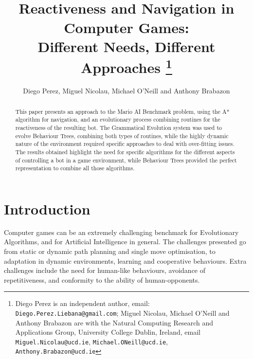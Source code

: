 \documentclass[conference]{IEEEtran}
\begin{document}
\title{\ \\ \LARGE\bf Reactiveness and Navigation in Computer Games:\\ Different Needs, Different Approaches \thanks{Diego Perez is an independent author, email: {\tt Diego.Perez.Liebana@gmail.com}; Miguel Nicolau, Michael O'Neill and Anthony Brabazon are with the Natural Computing Research and Applications Group, University College Dublin, Ireland, email {\tt Miguel.Nicolau@ucd.ie}, {\tt Michael.ONeill@ucd.ie}, {\tt Anthony.Brabazon@ucd.ie}}}


\author{Diego Perez, Miguel Nicolau, Michael O'Neill and Anthony Brabazon}


\maketitle

\begin{abstract}
This paper presents an approach to the Mario AI Benchmark problem, using
the A* algorithm for navigation, and an evolutionary process combining
routines for the reactiveness of the resulting bot. The Grammatical
Evolution system was used to evolve Behaviour Trees, combining both types of
routines, while the highly dynamic nature of the environment required specific
approaches to deal with over-fitting issues. The results obtained highlight
the need for specific algorithms for the different aspects of controlling a bot
in a game environment, while Behaviour Trees provided the perfect
representation to combine all those algorithms.
\end{abstract}

\section{Introduction}

Computer games can be an extremely challenging benchmark for Evolutionary
Algorithms, and for Artificial Intelligence in general. The challenges
presented go from static or dynamic path planning and single move optimisation, to
adaptation in dynamic environments, learning and cooperative behaviours. Extra
challenges include the need for human-like behaviours, avoidance of
repetitiveness, and conformity to the ability of human-opponents.
\end{document}
